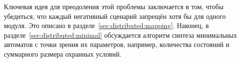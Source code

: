 Ключевая идея для преодоления этой проблемы заключается в том, чтобы убедиться, что каждый негативный сценарий запрещён хотя бы для одного модуля.
Это описано в разделе~\ref{sec:distributed:mapping}.
Наконец, в разделе~\ref{sec:distributed:minimal} обсуждается алгоритм синтеза минимальных автоматов с точки зрения их параметров, например, количества состояний и суммарного размера охранных условий.







